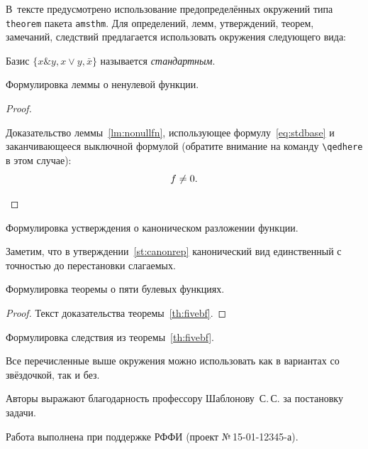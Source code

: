 \begin{lmrarticle}
В~тексте предусмотрено использование предопределённых окружений типа
\texttt{theorem} пакета \texttt{amsthm}. Для определений, лемм, утверждений,
теорем, замечаний, следствий предлагается использовать окружения следующего
вида:
\begin{definition*}
Базис $\{x \& y, x \vee y, {\bar x}\}$ называется \emph{стандартным}.
\end{definition*}
\begin{lemma}
\label{lm:nonullfn}
Формулировка леммы о ненулевой функции.
\end{lemma}
\begin{proof}
\begin{sloppy}
Доказательство леммы~\ref{lm:nonullfn}, использующее формулу~\eqref{eq:stdbase}
и заканчивающееся выключной формулой (обратите внимание на команду
\verb|\qedhere| в этом случае):
\begin{equation*}
f \neq 0. \qedhere%
\end{equation*}
\end{sloppy}
\end{proof}
\begin{statement}
\label{st:canonrep}
Формулировка устверждения о каноническом разложении функции.
\end{statement}
\begin{remark*}
Заметим, что в утверждении~\ref{st:canonrep} канонический вид единственный с
точностью до перестановки слагаемых.
\end{remark*}
\begin{theorem}
\label{th:fivebf}
Формулировка теоремы о пяти булевых функциях.
\end{theorem}
\begin{proof}
Текст доказательства теоремы~\ref{th:fivebf}.
\end{proof}
\begin{corollary*}
Формулировка следствия из теоремы~\ref{th:fivebf}.
\end{corollary*}
Все перечисленные выше окружения можно использовать как в вариантах со
звёздочкой, так и без.

Авторы выражают благодарность профессору Шаблонову~С.\,С. за постановку задачи.

Работа выполнена при поддержке РФФИ (проект \hbox{№\,15-01-12345-а}).


\end{lmrarticle}
